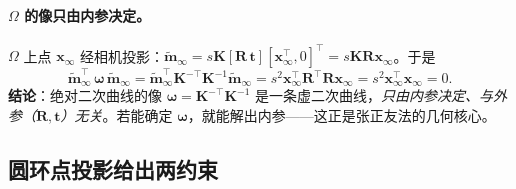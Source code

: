 \paragraph{$\Omega$ 的像只由内参决定。}
$\Omega$ 上点 $\mathbf{x}_\infty$ 经相机投影：$\tilde{\mathbf{m}}_\infty=s\mathbf{K}[\mathbf{R}\,\mathbf{t}][\mathbf{x}_\infty^\top,0]^\top=s\mathbf{K}\mathbf{R}\mathbf{x}_\infty$。于是
\begin{equation}
  \tilde{\mathbf{m}}_\infty^\top\,\boldsymbol{\omega}\,\tilde{\mathbf{m}}_\infty
  =\tilde{\mathbf{m}}_\infty^\top\mathbf{K}^{-\top}\mathbf{K}^{-1}\tilde{\mathbf{m}}_\infty
  =s^2\mathbf{x}_\infty^\top\mathbf{R}^\top\mathbf{R}\mathbf{x}_\infty
  =s^2\mathbf{x}_\infty^\top\mathbf{x}_\infty=0.
  \label{eq:calib-iac-invariant}
\end{equation}
\textbf{结论}：绝对二次曲线的像 $\boldsymbol{\omega}=\mathbf{K}^{-\top}\mathbf{K}^{-1}$ 是一条虚二次曲线，\emph{只由内参决定、与外参（$\mathbf{R},\mathbf{t}$）无关}。若能确定 $\boldsymbol{\omega}$，就能解出内参——这正是张正友法的几何核心。

\subsection{圆环点投影给出两约束}

